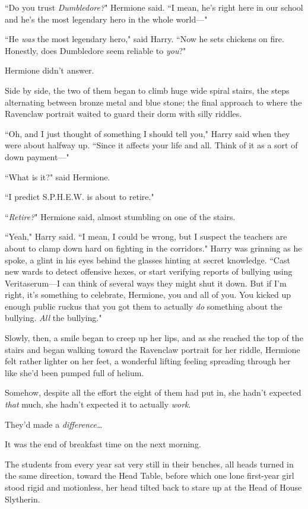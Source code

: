 ``Do you trust \emph{Dumbledore?}" Hermione said. ``I mean, he's right here in our school and he's the most legendary hero in the whole world—"

``He \emph{was} the most legendary hero," said Harry. ``Now he sets chickens on fire. Honestly, does Dumbledore seem reliable to \emph{you}?"

Hermione didn't answer.

Side by side, the two of them began to climb huge wide spiral stairs, the steps alternating between bronze metal and blue stone; the final approach to where the Ravenclaw portrait waited to guard their dorm with silly riddles.

``Oh, and I just thought of something I should tell you," Harry said when they were about halfway up. ``Since it affects your life and all. Think of it as a sort of down payment—"

``What is it?" said Hermione.

``I predict S.P.H.E.W. is about to retire."

``\emph{Retire?}" Hermione said, almost stumbling on one of the stairs.

``Yeah," Harry said. ``I mean, I could be wrong, but I suspect the teachers are about to clamp down hard on fighting in the corridors." Harry was grinning as he spoke, a glint in his eyes behind the glasses hinting at secret knowledge. ``Cast new wards to detect offensive hexes, or start verifying reports of bullying using Veritaserum—I can think of several ways they might shut it down. But if I'm right, it's something to celebrate, Hermione, you and all of you. You kicked up enough public ruckus that you got them to actually \emph{do} something about the bullying. \emph{All} the bullying."

Slowly, then, a smile began to creep up her lips, and as she reached the top of the stairs and began walking toward the Ravenclaw portrait for her riddle, Hermione felt rather lighter on her feet, a wonderful lifting feeling spreading through her like she'd been pumped full of helium.

Somehow, despite all the effort the eight of them had put in, she hadn't expected \emph{that} much, she hadn't expected it to actually \emph{work}.

They'd made a \emph{difference{\ldots}}

\later

It was the end of breakfast time on the next morning.

The students from every year sat very still in their benches, all heads turned in the same direction, toward the Head Table, before which one lone first-year girl stood rigid and motionless, her head tilted back to stare up at the Head of House Slytherin.

